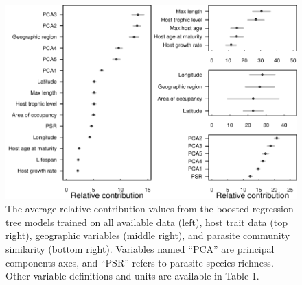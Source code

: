 \documentclass[12pt]{article}
\begin{document}
 \begin{figure}[h!]
  \includegraphics[width=\textwidth]{Figures/megaBRT.pdf}
  \caption{The average relative contribution values from the boosted regression tree models trained on all available data (left), host trait data (top right), geographic variables (middle right), and parasite community similarity (bottom right). Variables named ``PCA'' are principal components axes, and ``PSR'' refers to parasite species richness. Other variable definitions and units are available in Table 1. }
 \label{fig:megaBRT}
 \end{figure}

 
 


 
 


\end{document}
